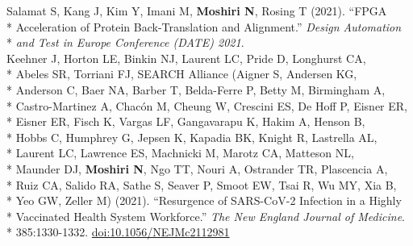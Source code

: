 \documentclass[margin,line]{res}
\begin{document}
\begin{resume}
\hspace*{4mm} Salamat S, Kang J, Kim Y, Imani M, \textbf{Moshiri N}, Rosing T (2021). ``FPGA\\*
\hspace*{9.5mm} Acceleration of Protein Back-Translation and Alignment.'' \textit{Design Automation}\\*\vspace{2mm}
\hspace*{8mm} \textit{and Test in Europe Conference (DATE) 2021}.\\
\hspace*{4mm} Keehner J, Horton LE, Binkin NJ, Laurent LC, Pride D, Longhurst CA,\\*
\hspace*{9.5mm} Abeles SR, Torriani FJ, SEARCH Alliance (Aigner S, Andersen KG,\\*
\hspace*{9.5mm} Anderson C, Baer NA, Barber T, Belda-Ferre P, Betty M, Birmingham A,\\*
\hspace*{9.5mm} Castro-Martinez A, Chac\'on M, Cheung W, Crescini ES, De Hoff P, Eisner ER,\\*
\hspace*{9.5mm} Eisner ER, Fisch K, Vargas LF, Gangavarapu K, Hakim A, Henson B,\\*
\hspace*{9.5mm} Hobbs C, Humphrey G, Jepsen K, Kapadia BK, Knight R, Lastrella AL,\\*
\hspace*{9.5mm} Laurent LC, Lawrence ES, Machnicki M, Marotz CA, Matteson NL,\\*
\hspace*{9.5mm} Maunder DJ, \textbf{Moshiri N}, Ngo TT, Nouri A, Ostrander TR, Plascencia A,\\*
\hspace*{9.5mm} Ruiz CA, Salido RA, Sathe S, Seaver P, Smoot EW, Tsai R, Wu MY, Xia B,\\*
\hspace*{9.5mm} Yeo GW, Zeller M) (2021). ``Resurgence of SARS-CoV-2 Infection in a Highly\\*
\hspace*{9.5mm} Vaccinated Health System Workforce.'' \textit{The New England Journal of Medicine}.\\*\vspace{2mm}
\hspace*{8mm} 385:1330-1332. \href{https://doi.org/10.1056/NEJMc2112981}{doi:10.1056/NEJMc2112981}\\

\end{resume}
\end{document}
